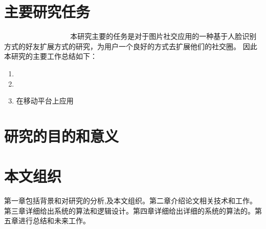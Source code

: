 \section{主要研究任务}
􏰉􏴳􏰭􏴴􏴵􏴶􏴷􏰿􏴸􏴹􏴘􏰏􏲦􏲜􏱲􏴺􏰭􏴻􏲆􏴻􏴼􏰏􏱦􏴷􏱜􏰒􏴽􏳯􏴾􏴿􏵀􏱾􏱜本研究主要的任务是对于图片社交应用的一种基于人脸识别方式的好友扩展方式的研究，为用户一个良好的方式去扩展他们的社交圈。
因此本研究的主要工作总结如下：
\begin{enumerate}
\item 
\item 
\item 在移动平台上应用

\end{enumerate}
\section{研究的目的和意义}
\section{本文组织}
第一章包括背景和对研究的分析,及本文组织。第二章介绍论文相关技术和工作。第三章详细给出系统的算法和逻辑设计。第四章详细给出详细的系统的算法的。第五章进行总结和未来工作。

